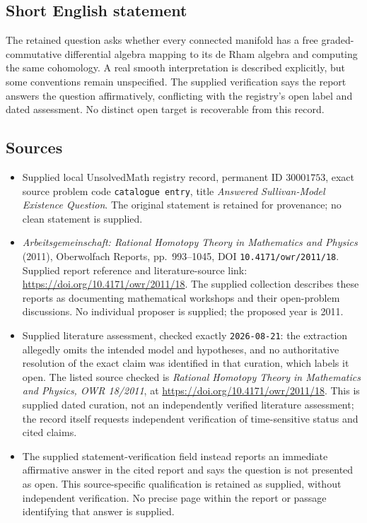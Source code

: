 \documentclass[11pt]{article}
\begin{document}
\subsection{Short English statement}
The retained question asks whether every connected manifold has a free graded-commutative differential algebra mapping to its de Rham algebra and computing the same cohomology. A real smooth interpretation is described explicitly, but some conventions remain unspecified. The supplied verification says the report answers the question affirmatively, conflicting with the registry's open label and dated assessment. No distinct open target is recoverable from this record.
\subsection{Sources}
\begin{itemize}
\item Supplied local UnsolvedMath registry record, permanent ID \(30001753\), exact source problem code \texttt{catalogue entry}, title \emph{Answered Sullivan-Model Existence Question}. The original statement is retained for provenance; no clean statement is supplied.
\item \emph{Arbeitsgemeinschaft: Rational Homotopy Theory in Mathematics and Physics} (2011), Oberwolfach Reports, pp.\ 993--1045, DOI \texttt{10.4171/owr/2011/18}. Supplied report reference and literature-source link: \url{https://doi.org/10.4171/owr/2011/18}. The supplied collection describes these reports as documenting mathematical workshops and their open-problem discussions. No individual proposer is supplied; the proposed year is 2011.
\item Supplied literature assessment, checked exactly \texttt{2026-08-21}: the extraction allegedly omits the intended model and hypotheses, and no authoritative resolution of the exact claim was identified in that curation, which labels it open. The listed source checked is \emph{Rational Homotopy Theory in Mathematics and Physics, OWR 18/2011}, at \url{https://doi.org/10.4171/owr/2011/18}. This is supplied dated curation, not an independently verified literature assessment; the record itself requests independent verification of time-sensitive status and cited claims.
\item The supplied statement-verification field instead reports an immediate affirmative answer in the cited report and says the question is not presented as open. This source-specific qualification is retained as supplied, without independent verification. No precise page within the report or passage identifying that answer is supplied.
\end{itemize}
\end{document}
